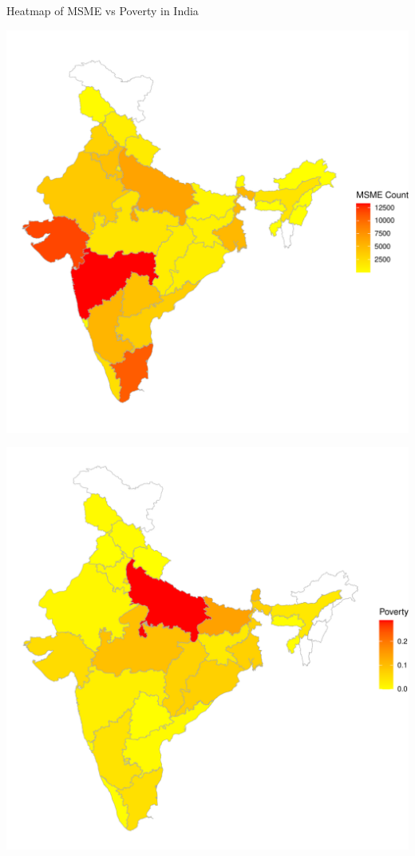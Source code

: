 \documentclass[10pt,aspectratio=169]{beamer}
\begin{document}
\begin{frame}{Heatmap of MSME vs Poverty in India}
    \begin{minipage}{0.5\linewidth}
    \centering
    \includegraphics[width=\linewidth]{msme_plot.pdf}
    \label{fig:msme}
\end{minipage}%
\begin{minipage}{0.47\linewidth}
    \centering
    \includegraphics[width=\linewidth]{poverty_plot.pdf}
    \label{fig:poverty}
\end{minipage}
\end{frame}
\end{document}
